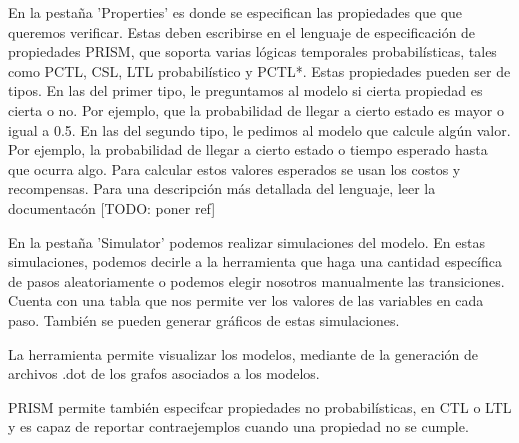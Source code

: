 \documentclass[runningheads]{llncs}
\begin{document}
En la pestaña 'Properties' es donde se especifican las propiedades que que queremos verificar. Estas deben escribirse en el lenguaje de especificación de propiedades PRISM, que soporta varias lógicas temporales probabilísticas, tales como PCTL, CSL, LTL probabilístico y PCTL*. Estas propiedades pueden ser de tipos. En las del primer tipo, le preguntamos al modelo si cierta propiedad es cierta o no. Por ejemplo, que la probabilidad de llegar a cierto estado es mayor o igual a 0.5. En las del segundo tipo, le pedimos al modelo que calcule algún valor. Por ejemplo, la probabilidad de llegar a cierto estado o tiempo esperado hasta que ocurra algo. Para calcular estos valores esperados se usan los costos y recompensas.
Para una descripción más detallada del lenguaje, leer la documentacón [TODO: poner ref]

En la pestaña 'Simulator' podemos realizar simulaciones del modelo. En estas simulaciones, podemos decirle a la herramienta que haga una cantidad específica de pasos aleatoriamente o podemos elegir nosotros manualmente las transiciones. Cuenta con una tabla que nos permite ver los valores de las variables en cada paso. También se pueden generar gráficos de estas simulaciones.

La herramienta permite visualizar los modelos, mediante de la generación de archivos .dot de los grafos asociados a los modelos.

PRISM permite también especifcar propiedades no probabilísticas, en CTL o LTL y es capaz de reportar contraejemplos cuando una propiedad no se cumple.
\end{document}
